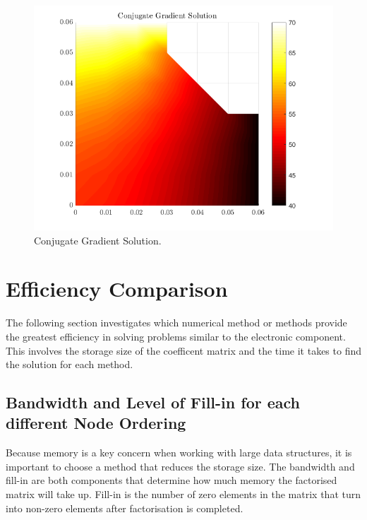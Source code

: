 \documentclass[12pt,a4paper]{article}
\begin{document}
\begin{figure}[H]
	\includegraphics[width=\linewidth]{images/conjugategradientsolution.png}
	\caption{Conjugate Gradient Solution.}
	\label{fig:conjugate}
\end{figure}

\section{Efficiency Comparison}
The following section investigates which numerical method or methods provide the greatest efficiency in solving problems similar to the electronic component. This involves the storage size of the coefficent matrix and the time it takes to find the solution for each method.

\subsection{Bandwidth and Level of Fill-in for each different Node Ordering}
Because memory is a key concern when working with large data structures, it is important to choose a method that reduces the storage size. The bandwidth and fill-in are both components that determine how much memory the factorised matrix will take up. Fill-in is the number of zero elements in the matrix that turn into non-zero elements after factorisation is completed. 
\end{document}
